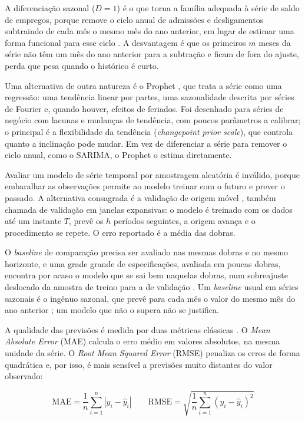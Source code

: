 A diferenciação sazonal ($D = 1$) é o que torna a família adequada à série de saldo de empregos, porque remove o ciclo anual de admissões e desligamentos subtraindo de cada mês o mesmo mês do ano anterior, em lugar de estimar uma forma funcional para esse ciclo \cite{Hyndman2021}. A desvantagem é que os primeiros $m$ meses da série não têm um mês do ano anterior para a subtração e ficam de fora do ajuste, perda que pesa quando o histórico é curto.

Uma alternativa de outra natureza é o Prophet \cite{Taylor2018}, que trata a série como uma regressão: uma tendência linear por partes, uma sazonalidade descrita por séries de Fourier e, quando houver, efeitos de feriados. Foi desenhado para séries de negócio com lacunas e mudanças de tendência, com poucos parâmetros a calibrar; o principal é a flexibilidade da tendência (\textit{changepoint prior scale}), que controla quanto a inclinação pode mudar. Em vez de diferenciar a série para remover o ciclo anual, como o SARIMA, o Prophet o estima diretamente.

Avaliar um modelo de série temporal por amostragem aleatória é inválido, porque embaralhar as observações permite ao modelo treinar com o futuro e prever o passado. A alternativa consagrada é a validação de origem móvel \cite{Tashman2000}, também chamada de validação em janelas expansivas: o modelo é treinado com os dados até um instante $T$, prevê os $h$ períodos seguintes, a origem avança e o procedimento se repete. O erro reportado é a média das dobras.

O \textit{baseline} de comparação precisa ser avaliado nas mesmas dobras e no mesmo horizonte, e uma grade grande de especificações, avaliada em poucas dobras, encontra por acaso o modelo que se sai bem naquelas dobras, num sobreajuste deslocado da amostra de treino para a de validação \cite{Tashman2000, Hyndman2021}. Um \textit{baseline} usual em séries sazonais é o ingênuo sazonal, que prevê para cada mês o valor do mesmo mês do ano anterior \cite{Hyndman2021}; um modelo que não o supera não se justifica.

A qualidade das previsões é medida por duas métricas clássicas \cite{Hyndman2021}. O \textit{Mean Absolute Error} (MAE) calcula o erro médio em valores absolutos, na mesma unidade da série. O \textit{Root Mean Squared Error} (RMSE) penaliza os erros de forma quadrática e, por isso, é mais sensível a previsões muito distantes do valor observado:

\begin{equation}
    \text{MAE} = \frac{1}{n}\sum_{i=1}^{n}|y_i - \hat{y}_i|
    \qquad
    \text{RMSE} = \sqrt{\frac{1}{n}\sum_{i=1}^{n}(y_i - \hat{y}_i)^2}
\end{equation}

